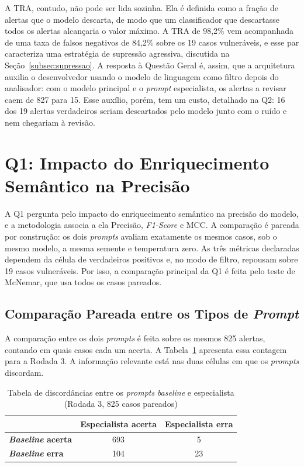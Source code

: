 A TRA, contudo, não pode ser lida sozinha. Ela é definida como a fração de alertas que o modelo descarta, de modo que um classificador que descartasse todos os alertas alcançaria o valor máximo. A TRA de 98,2\% vem acompanhada de uma taxa de falsos negativos de 84,2\% sobre os 19 casos vulneráveis, e esse par caracteriza uma estratégia de supressão agressiva, discutida na Seção~\ref{subsec:supressao}. A resposta à Questão Geral é, assim, que a arquitetura auxilia o desenvolvedor usando o modelo de linguagem como filtro depois do analisador: com o modelo principal e o \textit{prompt} especialista, os alertas a revisar caem de 827 para 15. Esse auxílio, porém, tem um custo, detalhado na Q2: 16 dos 19 alertas verdadeiros seriam descartados pelo modelo junto com o ruído e nem chegariam à revisão.

\section{Q1: Impacto do Enriquecimento Semântico na Precisão}
\label{sec:q1}

A Q1 pergunta pelo impacto do enriquecimento semântico na precisão do modelo, e a metodologia associa a ela Precisão, \textit{F1-Score} e MCC. A comparação é pareada por construção: os dois \textit{prompts} avaliam exatamente os mesmos casos, sob o mesmo modelo, a mesma semente e temperatura zero. As três métricas declaradas dependem da célula de verdadeiros positivos e, no modo de filtro, repousam sobre 19 casos vulneráveis. Por isso, a comparação principal da Q1 é feita pelo teste de McNemar, que usa todos os casos pareados.

\subsection{Comparação Pareada entre os Tipos de \textit{Prompt}}
\label{subsec:q1pareado}

A comparação entre os dois \textit{prompts} é feita sobre os mesmos 825 alertas, contando em quais casos cada um acerta. A Tabela~\ref{tab:mcnemar} apresenta essa contagem para a Rodada 3. A informação relevante está nas duas células em que os \textit{prompts} discordam.

\begin{table}[htpb]
    \centering
    \caption[Discordâncias entre os \textit{prompts} (McNemar)]{Tabela de discordâncias entre os \textit{prompts} \textit{baseline} e especialista (Rodada 3, 825 casos pareados)}
    \label{tab:mcnemar}
    \renewcommand{\arraystretch}{1.4}
    \begin{tabular}{|l|c|c|}
        \hline
         & \textbf{Especialista acerta} & \textbf{Especialista erra} \\
        \hline
        \textbf{\textit{Baseline} acerta} & 693 & 5 \\
        \hline
        \textbf{\textit{Baseline} erra} & 104 & 23 \\
        \hline
    \end{tabular}
    \fontepesquisa
\end{table}

